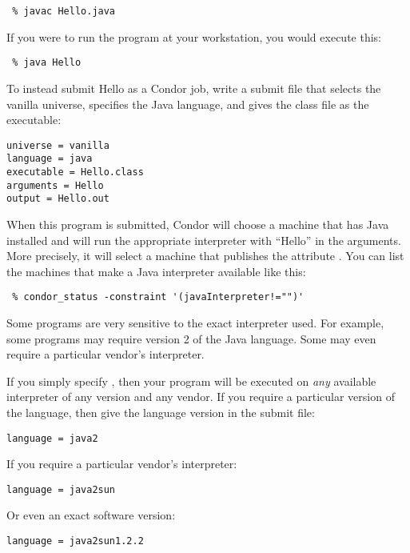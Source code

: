 \begin{verbatim}
 % javac Hello.java
\end{verbatim}

If you were to run the program at your workstation, you would
execute this:

\begin{verbatim}
 % java Hello
\end{verbatim}

To instead submit Hello as a Condor job, write a submit file that selects the
vanilla universe, specifies the Java language, and gives the class
file as the executable:

\begin{verbatim}
universe = vanilla
language = java
executable = Hello.class
arguments = Hello
output = Hello.out
\end{verbatim}

When this program is submitted, Condor will choose a machine that has
Java installed and will run the appropriate interpreter with ``Hello''
in the arguments.  More precisely, it will select a machine that
publishes the attribute .  You can list the
machines that make a Java interpreter available like this:

\begin{verbatim}
 % condor_status -constraint '(javaInterpreter!="")'
\end{verbatim}

Some programs are very sensitive to the exact interpreter used.
For example, some programs may require version 2 of the Java
language.  Some may even require a particular vendor's
interpreter.

If you simply specify , then your program
will be executed on \emph{any} available interpreter of any version
and any vendor.  If you require a particular version of the language,
then give the language version in the submit file:

\begin{verbatim}
language = java2
\end{verbatim}

If you require a particular vendor's interpreter:

\begin{verbatim}
language = java2sun
\end{verbatim}

Or even an exact software version:

\begin{verbatim}
language = java2sun1.2.2
\end{verbatim}

